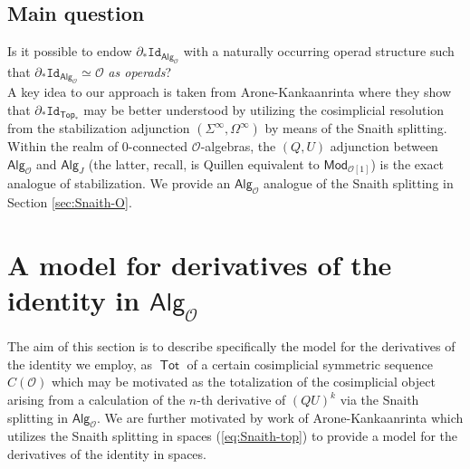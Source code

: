 \documentclass[11pt]{amsart}
\theoremstyle{definition}
\theoremstyle{remark}
\newcommand{\Sp}{\Sigma^{\infty}}
\newcommand{\U}{\Omega^{\infty}}
\newcommand{\Tot}{\operatorname{\mathsf{Tot}}}
\newcommand{\Alg}[1]{ {\mathsf{Alg}_{\mathcal{#1}}} }
\newcommand{\Id}{\mathtt{Id}}
\newcommand{\Cal}[1]{\mathcal{#1}}
\begin{document}
\subsection{Main question} \label{question} Is it possible to endow $\partial_* \Id_{\Alg{O}}$ with a naturally occurring operad structure such that $\partial_* \Id_{\Alg{O}}\simeq \Cal{O}$ \textit{as operads}?\\

A key idea to our approach is taken from Arone-Kankaanrinta \cite{AK} where they show that $\partial_* \Id_{\mathsf{Top}_*}$ may be better understood by utilizing the cosimplicial resolution from the stabilization adjunction $(\Sp,\U)$ by means of the Snaith splitting. Within the realm of $0$-connected $\Cal{O}$-algebras, the $(Q,U)$ adjunction between $\Alg{O}$ and $\mathsf{Alg}_J$ (the latter, recall, is Quillen equivalent to $\mathsf{Mod}_{\Cal{O}[1]}$) is the exact analogue of stabilization. We provide an $\Alg{O}$ analogue of the Snaith splitting in Section \ref{sec:Snaith-O}.


\section{A model for derivatives of the identity in $\Alg{O}$}
The aim of this section is to describe specifically the model for the derivatives of the identity we employ, as $\Tot$ of a certain cosimplicial symmetric sequence $C(\Cal{O})$ which may be motivated as the totalization of the cosimplicial object arising from a calculation of the $n$-th derivative of $(QU)^k$ via the Snaith splitting in $\Alg{O}$. We are further motivated by work of Arone-Kankaanrinta \cite{AK} which utilizes the Snaith splitting in spaces (\ref{eq:Snaith-top}) to provide a model for the derivatives of the identity in spaces. 
\end{document}
